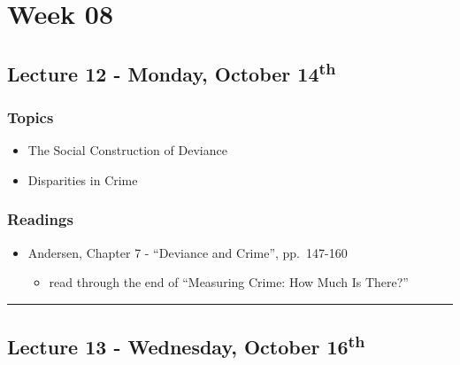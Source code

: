 \documentclass[]{book}
\providecommand{\tightlist}{%
  \setlength{\itemsep}{0pt}\setlength{\parskip}{0pt}}
\begin{document}
\newpage

\hypertarget{week-08}{%
\section*{Week 08}\label{week-08}}

\hypertarget{lecture-12---monday-october-14th}{%
\subsection*{\texorpdfstring{Lecture 12 - Monday, October 14\textsuperscript{th}}{Lecture 12 - Monday, October 14th}}\label{lecture-12---monday-october-14th}}

\hypertarget{topics-14}{%
\subsubsection*{Topics}\label{topics-14}}

\begin{itemize}
\tightlist
\item
  The Social Construction of Deviance
\item
  Disparities in Crime
\end{itemize}

\hypertarget{readings-13}{%
\subsubsection*{Readings}\label{readings-13}}

\begin{itemize}
\tightlist
\item
  Andersen, Chapter 7 - ``Deviance and Crime'', pp.~147-160

  \begin{itemize}
  \tightlist
  \item
    read through the end of ``Measuring Crime: How Much Is There?''
  \end{itemize}
\end{itemize}

\begin{center}\rule{0.5\linewidth}{\linethickness}\end{center}

\hypertarget{lecture-13---wednesday-october-16th}{%
\subsection*{\texorpdfstring{Lecture 13 - Wednesday, October 16\textsuperscript{th}}{Lecture 13 - Wednesday, October 16th}}\label{lecture-13---wednesday-october-16th}}
\end{document}
